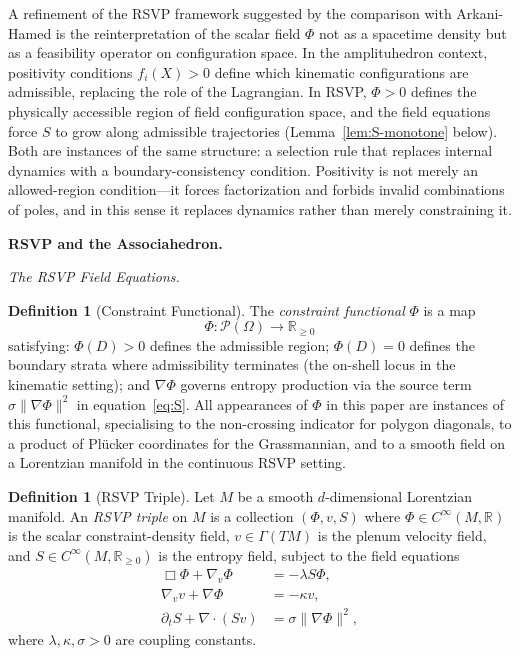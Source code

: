 \documentclass[11pt]{article}
\theoremstyle{plain}
\theoremstyle{definition}
\newtheorem{definition}[theorem]{Definition}
\theoremstyle{remark}
\newcommand{\R}{\mathbb{R}}
\newcommand{\Phif}{\Phi}
\newcommand{\vf}{v}
\newcommand{\Sf}{S}
\newcommand{\OmKS}{\Omega}
\begin{document}
A refinement of the RSVP framework suggested by the comparison with Arkani-Hamed is the reinterpretation of the scalar field $\Phif$ not as a spacetime density but as a feasibility operator on configuration space. In the amplituhedron context, positivity conditions $f_i(X) > 0$ define which kinematic configurations are admissible, replacing the role of the Lagrangian. In RSVP, $\Phif > 0$ defines the physically accessible region of field configuration space, and the field equations force $\Sf$ to grow along admissible trajectories (Lemma~\ref{lem:S-monotone} below). Both are instances of the same structure: a selection rule that replaces internal dynamics with a boundary-consistency condition. Positivity is not merely an allowed-region condition---it forces factorization and forbids invalid combinations of poles, and in this sense it replaces dynamics rather than merely constraining it.

\bigskip\noindent\textbf{RSVP and the Associahedron.}
\label{sec:rsvp}

\medskip\noindent\textit{The RSVP Field Equations.}

\begin{definition}[Constraint Functional]
\label{def:constraint-functional}
The \emph{constraint functional} $\Phif$ is a map
\[
  \Phif : \mathcal{P}(\OmKS) \to \R_{\geq 0}
\]
satisfying: $\Phif(D) > 0$ defines the admissible region; $\Phif(D) = 0$ defines the boundary strata where admissibility terminates (the on-shell locus in the kinematic setting); and $\nabla\Phif$ governs entropy production via the source term $\sigma\|\nabla\Phif\|^2$ in equation~\eqref{eq:S}. All appearances of $\Phif$ in this paper are instances of this functional, specialising to the non-crossing indicator for polygon diagonals, to a product of Pl\"{u}cker coordinates for the Grassmannian, and to a smooth field on a Lorentzian manifold in the continuous RSVP setting.
\end{definition}

\begin{definition}[RSVP Triple]
Let $M$ be a smooth $d$-dimensional Lorentzian manifold. An \emph{RSVP triple} on $M$ is a collection $(\Phif, \vf, \Sf)$ where $\Phif \in C^\infty(M, \R)$ is the scalar constraint-density field, $\vf \in \Gamma(TM)$ is the plenum velocity field, and $\Sf \in C^\infty(M, \R_{\geq 0})$ is the entropy field, subject to the field equations
\begin{align}
  \Box \Phif + \nabla_\vf \Phif &= -\lambda \Sf \Phif, \label{eq:phi}\\
  \nabla_\vf \vf + \nabla \Phif &= -\kappa \vf, \label{eq:v}\\
  \partial_t \Sf + \nabla \cdot (\Sf \vf) &= \sigma \|\nabla \Phif\|^2, \label{eq:S}
\end{align}
where $\lambda, \kappa, \sigma > 0$ are coupling constants.
\end{definition}
\end{document}
